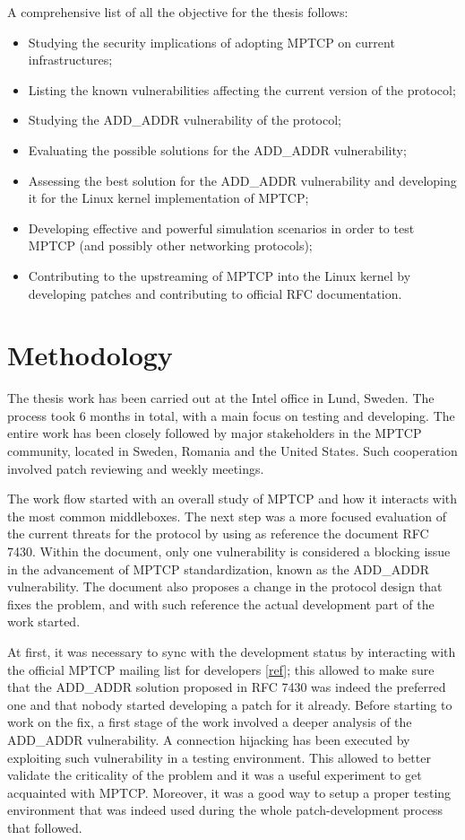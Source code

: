 A comprehensive list of all the objective for the thesis follows:
\begin{itemize}
    \item Studying the security implications of adopting MPTCP on current infrastructures; 
    \item Listing the known vulnerabilities affecting the current version of the protocol; 
    \item Studying the ADD\_ADDR vulnerability of the protocol;
    \item Evaluating the possible solutions for the ADD\_ADDR vulnerability; 
    \item Assessing the best solution for the ADD\_ADDR vulnerability and developing it for the Linux kernel implementation of MPTCP;
    \item Developing effective and powerful simulation scenarios in order to test MPTCP (and possibly other networking protocols);
    \item Contributing to the upstreaming of MPTCP into the Linux kernel by developing patches and contributing to official RFC documentation.
\end{itemize}

\section{Methodology}
The thesis work has been carried out at the Intel office in Lund, Sweden. The process took 6 months in total, with a main focus on testing and developing. The entire work has been closely followed by major stakeholders in the MPTCP community, located in Sweden, Romania and the United States. Such cooperation involved patch reviewing and weekly meetings.


The work flow started with an overall study of MPTCP and how it interacts with the most common middleboxes. The next step was a more focused evaluation of the current threats for the protocol by using as reference the document RFC 7430. Within the document, only one vulnerability is considered a blocking issue in the advancement of MPTCP standardization, known as the ADD\_ADDR vulnerability. The document also proposes a change in the protocol design that fixes the problem, and with such reference the actual development part of the work started.

\vspace{5mm}
At first, it was necessary to sync with the development status by interacting with the official MPTCP mailing list for developers [\href{https://listes-2.sipr.ucl.ac.be/sympa}{ref}]; this allowed to make sure that the ADD\_ADDR solution proposed in RFC 7430 was indeed the preferred one and that nobody started developing a patch for it already.
Before starting to work on the fix, a first stage of the work involved a deeper analysis of the ADD\_ADDR vulnerability. A connection hijacking has been executed by exploiting such vulnerability in a testing environment. This allowed to better validate the criticality of the problem and it was a useful experiment to get acquainted with MPTCP. Moreover, it was a good way to setup a proper testing environment that was indeed used during the whole patch-development process that followed.


